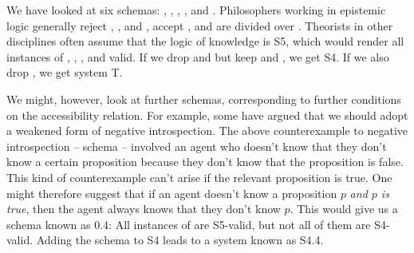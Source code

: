 

We have looked at six schemas: , , , , and .
Philosophers working in epistemic logic generally reject , , and
, accept , and are divided over . Theorists in other
disciplines often assume that the logic of knowledge is S5, which would render
all instances of , , , and  valid. If we drop  and
 but keep  and , we get S4. If we also drop , we get
system T.

We might, however, look at further schemas, corresponding to further conditions
on the accessibility relation. For example, some have argued that we should
adopt a weakened form of negative introspection. The above counterexample to
negative introspection -- schema  -- involved an agent who doesn't know
that they don't know a certain proposition because they don't know that the
proposition is false. This kind of counterexample can't arise if the relevant
proposition is true. One might therefore suggest that if an agent doesn't know a
proposition $p$ \emph{and $p$ is true}, then the agent always knows that they
don't know $p$. This would give us a schema known as 0.4:
%
%
All instances of  are S5-valid, but not all of them are S4-valid. Adding
the schema to S4 leads to a system known as S4.4.


